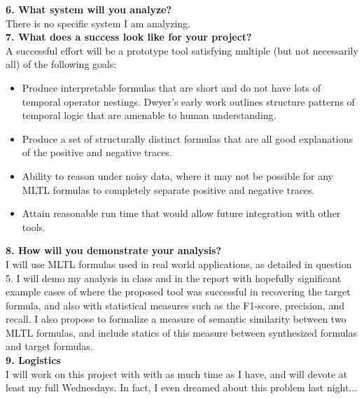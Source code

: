 \documentclass[12pt]{article}
\begin{document}
\noindent \textbf{6. What system will you analyze?}\\
There is no specific system I am analyzing. \\

\noindent \textbf{7. What does a success look like for your project?} \\
A successful effort will be a prototype tool satisfying multiple (but not necessarily all) of the following goals: 
\begin{itemize}
    \item Produce interpretable formulas that are short and do not have lots of temporal operator nestings. Dwyer's early work \cite{dwyer} outlines structure patterns of temporal logic that are amenable to human understanding. 
    \item Produce a set of structurally distinct formulas that are all good explanations of the positive and negative traces.
    \item Ability to reason under noisy data, where it may not be possible for any MLTL formulas to completely separate positive and negative traces.
    \item Attain reasonable run time that would allow future integration with other tools. 
\end{itemize}

\noindent \textbf{8.  How will you demonstrate your analysis?}\\
I will use MLTL formulas used in real world applications, as detailed in question 5. I will demo my analysis in class and in the report with hopefully significant example cases of where the proposed tool was successful in recovering the target formula, and also with statistical measures such as the F1-score, precision, and recall. I also propose to formalize a measure of semantic similarity between two MLTL formulas, and include statics of this measure between synthesized formulas and target formulas. 
\\

\noindent \textbf{9. Logistics}\\
I will work on this project with with as much time as I have, and will devote at least my full Wednesdays. In fact, I even dreamed about this problem last night... 
\\
\end{document}
